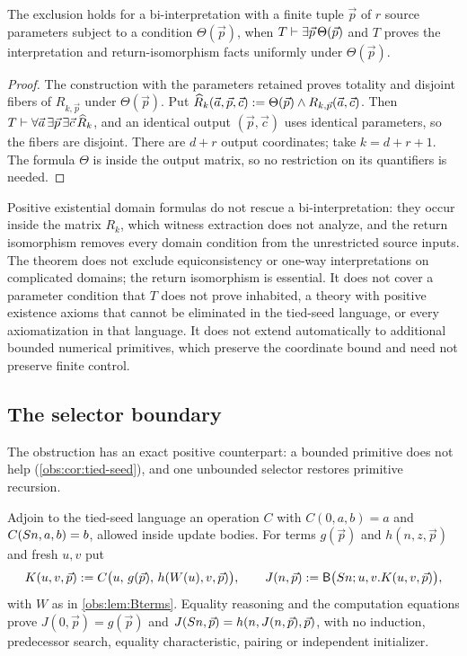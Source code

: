 \begin{corollary}
\label{obs:cor:parameters}
The exclusion holds for a bi-interpretation with a finite tuple $\vec p$ of
$r$ source parameters subject to a condition $\Theta(\vec p)$, when
$T\vdash\exists\vec p\,\Theta(\vec p)$ and $T$ proves the interpretation and
return-isomorphism facts uniformly under $\Theta(\vec p)$.
\end{corollary}

\begin{proof}
The construction with the parameters retained proves totality and disjoint
fibers of $R_{k,\vec p}$ under $\Theta(\vec p)$. Put
$\widehat R_k(\vec a,\vec p,\vec c)\mathrel{:=}\Theta(\vec p)\wedge R_{k,\vec p}(\vec a,\vec c)$.
Then $T\vdash\forall\vec a\,\exists\vec p\,\exists\vec c\,\widehat R_k$, and an
identical output $(\vec p,\vec c)$ uses identical parameters, so the fibers are
disjoint. There are $d+r$ output coordinates; take $k=d+r+1$. The formula
$\Theta$ is inside the output matrix, so no restriction on its quantifiers is
needed.
\end{proof}

\begin{remark}[Scope]
\label{obs:rem:biinterp-scope}
Positive existential domain formulas do not rescue a bi-interpretation: they
occur inside the matrix $R_k$, which witness extraction does not analyze, and
the return isomorphism removes every domain condition from the unrestricted
source inputs. The theorem does not exclude equiconsistency or one-way
interpretations on complicated domains; the return isomorphism is essential.
It does not cover a parameter condition that $T$ does not prove inhabited, a
theory with positive existence axioms that cannot be eliminated in the
tied-seed language, or every axiomatization in that language. It does not
extend automatically to additional bounded numerical primitives, which preserve
the coordinate bound and need not preserve finite control.
\end{remark}

\subsection{The selector boundary}

The obstruction has an exact positive counterpart: a bounded primitive does not
help (\cref{obs:cor:tied-seed}), and one unbounded selector restores primitive
recursion.

\begin{proposition}
\label{obs:prop:selector-repair}
Adjoin to the tied-seed language an operation $C$ with $C(0,a,b)=a$ and
$C(S n,a,b)=b$, allowed inside update bodies. For terms $g(\vec p)$ and
$h(n,z,\vec p)$ and fresh $u,v$ put
\[
K(u,v,\vec p)\mathrel{:=} C\bigl(u,\,g(\vec p),\,h(W(u),v,\vec p)\bigr),\qquad
J(n,\vec p)\mathrel{:=}\mathsf{B}\bigl(S n;u,v.K(u,v,\vec p)\bigr),
\]
with $W$ as in \cref{obs:lem:Bterms}. Equality reasoning and the computation
equations prove $J(0,\vec p)=g(\vec p)$ and
$J(S n,\vec p)=h(n,J(n,\vec p),\vec p)$, with no induction, predecessor
search, equality characteristic, pairing or independent initializer.
\end{proposition}

